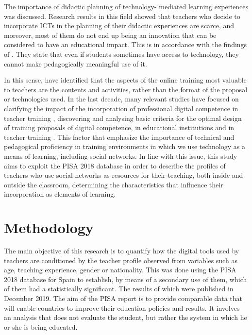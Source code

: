 \documentclass{textolivre}
\begin{document}
\begin{sloppypar}
The importance of didactic planning of technology- mediated learning experiences was discussed. Research results in this field \cite{gusman2017,hughes2015} showed that teachers who decide to incorporate ICTs in the planning of their didactic experiences are scarce, and moreover, most of them do not end up being an innovation that can be considered to have an educational impact. This is in accordance with the findings of \textcite{cortina2019}. They state that even if students sometimes have access to technology, they cannot make pedagogically meaningful use of it.
\end{sloppypar}

In this sense, \textcite{gomezgarcia2020} have identified that the aspects of the online training most valuable to teachers are the contents and activities, rather than the format of the proposal or technologies used. In the last decade, many relevant studies have focused on clarifying the impact of the incorporation of professional digital competence in teacher training \cite{instefjord2017}, discovering and analysing basic criteria for the optimal design of training proposals of digital competence, in educational institutions and in teacher training \cite{engen2015}.
This factor that emphasize the importance of technical and pedagogical proficiency in training environments in which we use technology as a means of learning, including social networks. In line with this issue, this study aims to exploit the PISA 2018 database in order to describe the profiles of teachers who use social networks as resources for their teaching, both inside and outside the classroom, determining the characteristics that influence their incorporation as elements of learning.

\section{Methodology}\label{sec-metodologia}

The main objective of this research is to quantify how the digital tools used by teachers are conditioned by the teacher profile observed from variables such as age, teaching experience, gender or nationality. This was done using the PISA 2018 database for Spain to establish, by means of a secondary use of them, which of them had a statistically significant. The results of which were published in December 2019. The aim of the PISA report is to provide comparable data that will enable countries to improve their education policies and results. It involves an analysis that does not evaluate the student, but rather the system in which he or she is being educated.
\end{document}
